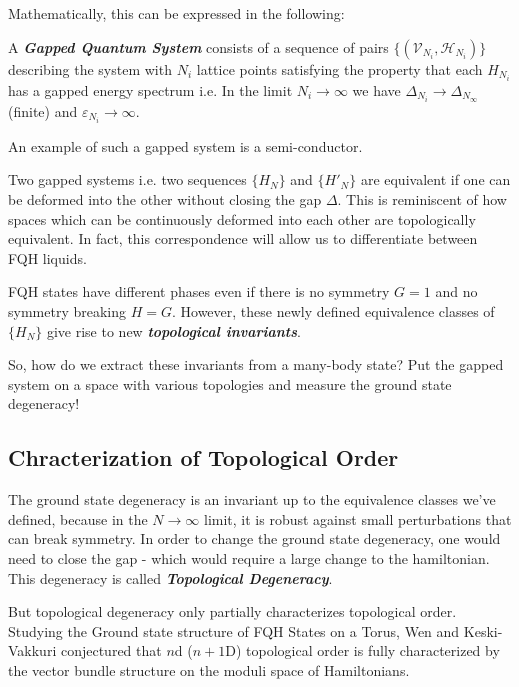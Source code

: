 \documentclass[11pt]{article}
\begin{document}
\vskip 0.5cm
Mathematically, this can be expressed in the following:
\begin{redbox}
    A \emph{\textbf{Gapped Quantum System}} consists of a sequence of pairs $\{ (\mathcal{V}_{N_i}, \mathcal{H}_{N_i}) \}$ describing the system with $N_i$ lattice points satisfying the property that each $H_{N_i}$ has a gapped energy spectrum i.e. In the limit $N_i \rightarrow \infty$ we have $\Delta_{N_i}\rightarrow \Delta_{N_{\infty}}$ (finite) and $\varepsilon_{N_i} \rightarrow \infty$.
\end{redbox}

\begin{bluebox}
    An example of such a gapped system is a semi-conductor.
\end{bluebox}

\vskip 0.5cm
Two gapped systems i.e. two sequences $\{H_N\}$ and $\{H'_N\}$ are equivalent if one can be deformed into the other without closing the gap $\Delta$. This is reminiscent of how spaces which can be continuously deformed into each other are topologically equivalent. In fact, this correspondence will allow us to differentiate between FQH liquids. 

\vskip 0.5cm
FQH states have different phases even if there is no symmetry $G = 1$ and no symmetry breaking $H = G$. However, these newly defined equivalence classes of $\{H_N\}$ give rise to new \emph{\textbf{topological invariants}}.

\vskip 0.5cm
So, how do we extract these invariants from a many-body state?  Put the gapped system on a space with various topologies and measure the ground state degeneracy!

\subsection{Chracterization of Topological Order}

The ground state degeneracy is an invariant up to the equivalence classes we've defined, because in the $N \rightarrow \infty$ limit, it is robust against small perturbations that can break symmetry. In order to change the ground state degeneracy, one would need to close the gap - which would require a large change to the hamiltonian. This degeneracy is called \emph{\textbf{Topological Degeneracy}}.


\vskip 0.5cm
But topological degeneracy only partially characterizes topological order. Studying the Ground state structure of FQH States on a Torus, Wen and Keski-Vakkuri conjectured that $n$d ($n+1$D) topological order is fully characterized by the vector bundle structure on the moduli space of Hamiltonians.
\end{document}
